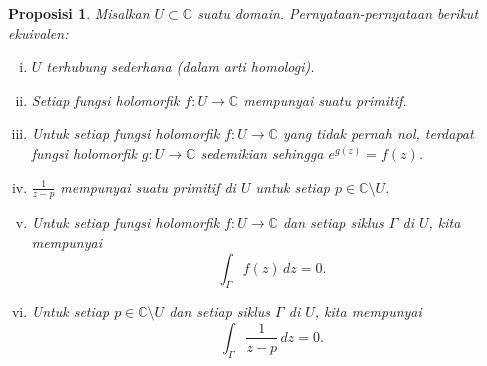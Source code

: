 \documentclass[12pt,openany]{book}
\newcommand{\C}{{\mathbb{C}}}
\theoremstyle{plain}
\newtheorem{prop}[thm]{Proposisi}
\theoremstyle{remark}
\theoremstyle{definition}
\theoremstyle{exercise}
\theoremstyle{example}
\begin{document}
\begin{prop}
Misalkan $U \subset \C$ suatu domain. Pernyataan-pernyataan berikut ekuivalen:
\begin{enumerate}[(i)]
\item \label{thm:simplyconnected:i}
$U$ terhubung sederhana (dalam arti homologi).
\item \label{thm:simplyconnected:ii}
Setiap fungsi holomorfik $f \colon U \to \C$ mempunyai suatu primitif.
\item \label{thm:simplyconnected:iii}
Untuk setiap fungsi holomorfik $f \colon U \to \C$ yang tidak pernah nol, terdapat
fungsi holomorfik $g \colon U \to \C$ sedemikian sehingga $e^{g(z)} = f(z)$.
\item \label{thm:simplyconnected:iv}
$\frac{1}{z-p}$ mempunyai suatu primitif di $U$ untuk setiap $p \in \C \setminus U$.
\item \label{thm:simplyconnected:v}
Untuk setiap fungsi holomorfik $f \colon U \to \C$ dan setiap
siklus $\Gamma$ di $U$, kita mempunyai
\begin{equation*}
\int_\Gamma f(z) \, dz = 0 .
\end{equation*}
\item \label{thm:simplyconnected:vi}
Untuk setiap $p \in \C \setminus U$ dan setiap
siklus $\Gamma$ di $U$, kita mempunyai
\begin{equation*}
\int_\Gamma \frac{1}{z-p} \, dz = 0 .
\end{equation*}
\end{enumerate}
\end{prop}
\end{document}
